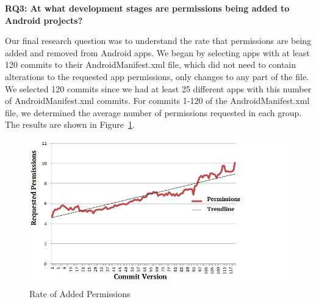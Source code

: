 \documentclass{sig-alternate-05-2015}
\begin{document}








\textbf{RQ3: At what development stages are permissions being added to Android projects?} %

Our final research question was to understand the rate that permissions are being added and removed from Android apps. We began by selecting apps with at least 120 commits to their AndroidManifest.xml file, which did not need to contain alterations to the requested app permissions, only changes to any part of the file. We selected 120 commits since we had at least 25 different apps with this number of AndroidManifest.xml commits. For commits 1-120 of the AndroidManifest.xml file, we determined the average number of permissions requested in each group. The results are shown in Figure~\ref{fig:Evolution}. 

          \begin{figure}[h!]
              \includegraphics[scale=0.55]{images/PermissionLifeCycleTrendLine.png}

              \caption{Rate of Added Permissions}
              \label{fig:Evolution}
          \end{figure}
\end{document}
